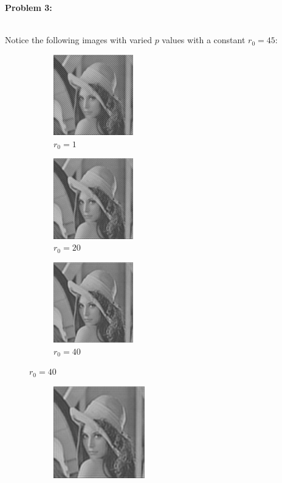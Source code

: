 \documentclass[11pt]{article}
\newenvironment{problem}[1]{\textbf{Problem #1: }}{\newpage}
\begin{document}
\begin{problem}{3}
\begin{enumerate}[label = (\alph*)]
\begin{figure}[h!]
\begin{subfigure}{.3 \textwidth}
				\end{subfigure}
			\end{figure}
			\\ 
			Notice the following images with varied $p$ values with a constant $r_0 = 45$:
			\\
			\begin{figure}[h!]
				\centering
				\begin{subfigure}{.3 \textwidth}
					\centering
					\includegraphics[height = 3.5cm]{Figures/Prob3/p1}
					\caption{$r_0 = 1$}
				\end{subfigure}
				\begin{subfigure}{.3 \textwidth}
					\centering
					\includegraphics[height = 3.5cm]{Figures/Prob3/p3}
					\caption{$r_0 = 20$}
				\end{subfigure}
				\begin{subfigure}{.3 \textwidth}
					\centering
					\includegraphics[height = 3.5cm]{Figures/Prob3/p6}
					\caption{$r_0 = 40$}
				\end{subfigure}
			\end{figure}
			\begin{figure}[h!]
				\centering
				\begin{subfigure}{.3 \textwidth}
					\centering
					\includegraphics[height = 4cm]{Figures/Prob3/p10}

\end{subfigure}
\end{figure}
\end{enumerate}
\end{problem}
\end{document}
